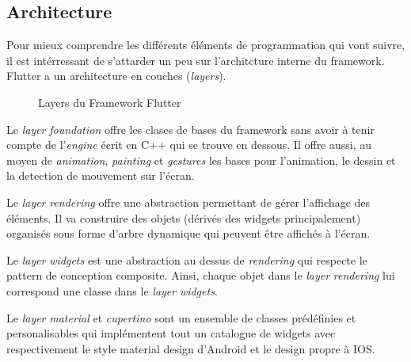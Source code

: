 \subsection{Architecture}
Pour mieux comprendre les différents éléments de programmation qui vont suivre, il est intérressant de s'attarder
un peu sur l'architcture interne du framework.
Flutter a un architecture en couches (\textit{layers}).
\begin{figure}[!h]
    \begin{center}
    \end{center}
    \caption{Layers du Framework Flutter}
    \label{fig:layers}
\end{figure}

Le \textit{layer} \textit{foundation} offre les clases de bases du framework sans avoir à tenir compte
de l'\textit{engine} écrit en C++ qui se trouve en dessous. Il offre aussi, au moyen de \textit{animation}, \textit{painting}
et \textit{gestures} les bases pour l'animation, le dessin et la detection de mouvement sur l'écran.

Le \textit{layer} \textit{rendering} offre une abstraction permettant de gérer l'affichage des éléments.
Il va construire des objets (dérivés des widgets principalement) organisés sous forme d'arbre dynamique qui peuvent être affichés à l'écran.

Le \textit{layer} \textit{widgets} est une abstraction au dessus de \textit{rendering} qui respecte le pattern de conception composite. Ainsi, chaque objet dans le \textit{layer} \textit{rendering}
lui correspond une classe dans le \textit{layer} \textit{widgets}.

Le \textit{layer} \textit{material} et \textit{cupertino} sont un ensemble de classes prédéfinies et personalisables qui implémentent tout un catalogue
de widgets avec respectivement le style material design d'Android et le design propre à IOS.

